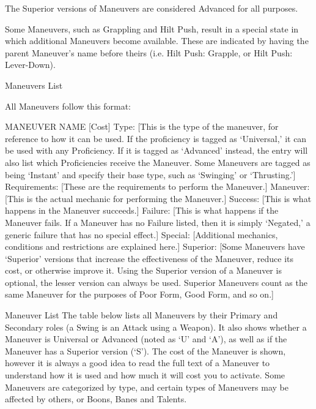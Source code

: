 \documentclass[oneside,11pt,english]{book}
\begin{document}
 

The Superior versions of Maneuvers are considered Advanced for all purposes. 


 

Some Maneuvers, such as Grappling and Hilt Push, result in a special state in which additional 
Maneuvers become available. These are indicated by having the parent Maneuver’s name before theirs 
(i.e. Hilt Push: Grapple, or Hilt Push: Lever-Down). 

 

Maneuvers List 

 

All Maneuvers follow this format: 

 

MANEUVER NAME [Cost] 
Type: [This is the type of the maneuver, for reference to how it can be used. If the proficiency is tagged 
as ‘Universal,’ it can be used with any Proficiency. If it is tagged as ‘Advanced’ instead, the entry will 
also list which Proficiencies receive the Maneuver. Some Maneuvers are tagged as being ‘Instant’ and 
specify their base type, such as ‘Swinging’ or ‘Thrusting.’] 
Requirements: [These are the requirements to perform the Maneuver.] 
Maneuver: [This is the actual mechanic for performing the Maneuver.] 
Success: [This is what happens in the Maneuver succeeds.] 
Failure: [This is what happens if the Maneuver fails. If a Maneuver has no Failure listed, then it is simply 
‘Negated,’ a generic failure that has no special effect.] 
Special: [Additional mechanics, conditions and restrictions are explained here.] 
Superior: [Some Maneuvers have ‘Superior’ versions that increase the effectiveness of the Maneuver, 
reduce its cost, or otherwise improve it. Using the Superior version of a Maneuver is optional, the lesser 
version can always be used. Superior Maneuvers count as the same Maneuver for the purposes of Poor 
Form, Good Form, and so on.] 
 
Maneuver List 
The table below lists all Maneuvers by their Primary and Secondary roles (a Swing is an Attack using a 
Weapon). It also shows whether a Maneuver is Universal or Advanced (noted as ‘U’ and ‘A’), as well as 
if the Maneuver has a Superior version (‘S’). The cost of the Maneuver is shown, however it is always a 
good idea to read the full text of a Maneuver to understand how it is used and how much it will cost you 
to activate. Some Maneuvers are categorized by type, and certain types of Maneuvers may be affected by 
others, or Boons, Banes and Talents. 
\end{document}
